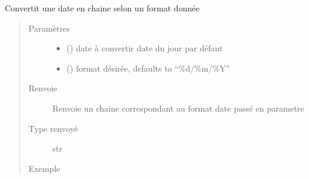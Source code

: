 \documentclass[letterpaper,10pt,french]{sphinxmanual}
\begin{document}
\begin{fulllineitems}
\label{\detokenize{modules/dtemng:toolbox.dtemng.datestr}}
Convertit une date en chaine selon un format donnée
\begin{quote}\begin{description}
\item[{Paramètres}] \leavevmode\begin{itemize}
\item {} 
 () \textendash{} date à convertir date du jour par défaut

\item {} 
 () \textendash{} format désirée, defaults to  “\%d/\%m/\%Y”

\end{itemize}

\item[{Renvoie}] \leavevmode
Renvoie un chaine correspondant au format date passé en parametre

\item[{Type renvoyé}] \leavevmode
str

\item[{Exemple}] \leavevmode
\begin{sphinxVerbatim}[commandchars=\\\{\}]
   
  
\end{sphinxVerbatim}

\end{description}\end{quote}

\end{fulllineitems}

\end{document}
